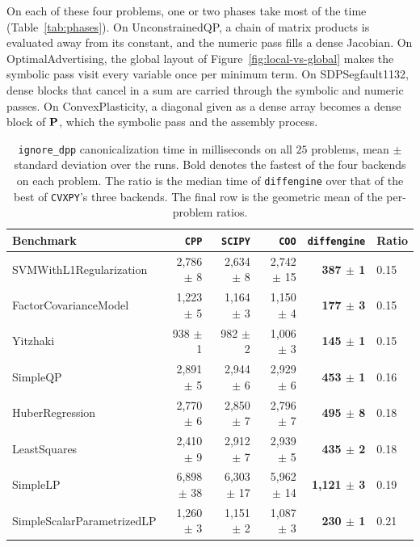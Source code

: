 On each of these four problems, one or two phases take most of the time
(Table~\ref{tab:phases}). On UnconstrainedQP, a chain of matrix products is evaluated away from
its constant, and the numeric pass fills a dense Jacobian. On OptimalAdvertising, the global
layout of Figure~\ref{fig:local-vs-global} makes the symbolic pass visit every variable once per
minimum term. On SDPSegfault1132, dense blocks that cancel in a sum are carried through the
symbolic and numeric passes. On ConvexPlasticity, a diagonal given as a dense array becomes a
dense block of $\mathbf{P}$, which the symbolic pass and the assembly process.

\begin{table}[htbp]
\centering
\caption[Canonicalization time on all problems]{\texttt{ignore\_dpp} canonicalization
time in milliseconds on all $25$ problems, mean $\pm$ standard deviation over the runs.
Bold denotes the fastest of the four backends on each problem. The ratio is the median time
of \texttt{diffengine} over that of the best of \texttt{CVXPY}'s three backends. The final row
is the geometric mean of the per-problem ratios.}
\label{tab:oneshot-compile}
{\footnotesize
\setlength{\tabcolsep}{3pt}
\begin{tabular}{l r r r r l}
\toprule
Benchmark & \texttt{CPP} & \texttt{SCIPY} & \texttt{COO} &
\texttt{diffengine} & Ratio \\
\midrule
SVMWithL1Regularization     & 2{,}786 $\pm$ 8 & 2{,}634 $\pm$ 8 & 2{,}742 $\pm$ 15 & \textbf{387 $\pm$ 1} & 0.15 \\
FactorCovarianceModel       & 1{,}223 $\pm$ 5 & 1{,}164 $\pm$ 3 & 1{,}150 $\pm$ 4 & \textbf{177 $\pm$ 3} & 0.15 \\
Yitzhaki                    & 938 $\pm$ 1 & 982 $\pm$ 2 & 1{,}006 $\pm$ 3 & \textbf{145 $\pm$ 1} & 0.15 \\
SimpleQP                    & 2{,}891 $\pm$ 5 & 2{,}944 $\pm$ 6 & 2{,}929 $\pm$ 6 & \textbf{453 $\pm$ 1} & 0.16 \\
HuberRegression             & 2{,}770 $\pm$ 6 & 2{,}850 $\pm$ 7 & 2{,}796 $\pm$ 7 & \textbf{495 $\pm$ 8} & 0.18 \\
LeastSquares                & 2{,}410 $\pm$ 9 & 2{,}912 $\pm$ 7 & 2{,}939 $\pm$ 5 & \textbf{435 $\pm$ 2} & 0.18 \\
SimpleLP                    & 6{,}898 $\pm$ 38 & 6{,}303 $\pm$ 17 & 5{,}962 $\pm$ 14 & \textbf{1{,}121 $\pm$ 3} & 0.19 \\
SimpleScalarParametrizedLP  & 1{,}260 $\pm$ 3 & 1{,}151 $\pm$ 2 & 1{,}087 $\pm$ 3 & \textbf{230 $\pm$ 1} & 0.21 \\

\end{tabular}}
\end{table}
